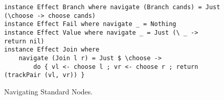 \begin{figure}
\begin{ccodebox}
\begin{lstlisting}[style=haskell]
instance Effect Branch where navigate (Branch cands) = Just (\choose -> choose cands)
instance Effect Fail where navigate _ = Nothing
instance Effect Value where navigate _ = Just (\ _ -> return nil)
instance Effect Join where
    navigate (Join l r) = Just $ \choose ->
        do { vl <- choose l ; vr <- choose r ; return (trackPair (vl, vr)) }
\end{lstlisting}
\end{ccodebox}
\vspace{-0.3cm}
\caption{Navigating Standard Nodes.}\label{fig:navigate-impl}
\end{figure}
